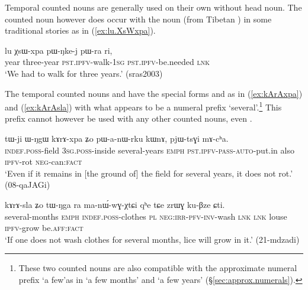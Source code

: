 Temporal counted nouns are generally used on their own without head noun. The counted noun  however does occur with the noun  (from Tibetan ) in some traditional stories as in (\ref{ex:lu.XsWxpa}).

\begin{exe}
\ex \label{ex:lu.XsWxpa}
\gll lu χsɯ-xpa pɯ-ŋke-j pɯ-ra ri, \\
year three-year \textsc{pst}.\textsc{ipfv}-walk-\textsc{1sg} \textsc{pst}.\textsc{ipfv}-be.needed \textsc{lnk} \\
\glt `We had to walk for three years.' (sras2003)
\end{exe} 

The temporal counted nouns  and  have the special forms  and  as in (\ref{ex:kArAxpa}) and (\ref{ex:kArAsla}) with what appears to be a numeral prefix  `several'.\footnote{These two counted nouns are also compatible with the approximate numeral prefix  `a few'as in  `a few months' and  `a few years' (§\ref{sec:approx.numerals}).
} This prefix cannot however be used with any other counted nouns, even . 


\begin{exe}
\ex \label{ex:kArAxpa}
\gll tɯ-ji ɯ-ŋgɯ kɤrɤ-xpa ʑo pɯ-a-nɯ-rku kɯnɤ, pjɯ-tsɣi mɤ-cʰa. \\
\textsc{indef}.\textsc{poss}-field \textsc{3sg}.\textsc{poss}-inside several-years \textsc{emph} \textsc{pst}.\textsc{ipfv}-\textsc{pass}-\textsc{auto}-put.in also \textsc{ipfv}-rot \textsc{neg}-can:\textsc{fact} \\
\glt `Even if it remains in [the ground of] the field for several years, it does not rot.' (08-qaJAGi)
\end{exe}

\begin{exe}
\ex \label{ex:kArAsla}
\gll kɤrɤ-sla ʑo tɯ-ŋga ra ma-nɯ́-wɣ-χtɕi qʰe tɕe zrɯɣ ku-βze ɕti.  \\
several-months \textsc{emph} \textsc{indef}.\textsc{poss}-clothes \textsc{pl} \textsc{neg}:\textsc{irr}-\textsc{pfv}-\textsc{inv}-wash \textsc{lnk} \textsc{lnk} louse \textsc{ipfv}-grow be.\textsc{aff}:\textsc{fact} \\
\glt `If one does not wash clothes for several months, lice will grow in it.' (21-mdzadi)
\end{exe}


